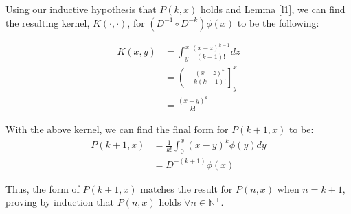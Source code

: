 \documentclass{article}[11pt]
\begin{document}
   Using our inductive hypothesis that $P(k,x)$ holds and Lemma \ref{l1}, we can find the resulting kernel, $K(\cdot,\cdot)$, for $(D^{-1} \circ D^{-k})\phi(x)$ to be the following:
   
   \begin{align*}
   K(x,y) &= \int_y^x \frac{(x-z)^{k-1}}{(k-1)!} dz \\
   &= \left( -\frac{(x-z)^{k}}{k(k-1)!} \right]_y^x \\
   &= \frac{(x-y)^{k}}{k!}
   \end{align*}
   
   With the above kernel, we can find the final form for $P(k+1,x)$ to be:
   \begin{align*}
   P(k+1,x) &= \frac{1}{k!}\int_0^x (x-y)^{k} \phi(y) dy \\
   &= D^{-(k+1)}\phi(x)
   \end{align*}
   
   Thus, the form of $P(k+1,x)$ matches the result for $P(n,x)$ when $n=k+1$, proving by induction that $P(n,x)$ holds $\forall n \in \mathbb{N}^{+}$.
   
\end{document}
